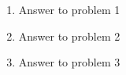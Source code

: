 

\oddsidemargin 0in
\evensidemargin 0in
\textwidth 6.5in
\topmargin -0.5in
\textheight 9.0in




\pagestyle{myheadings}

\begin{enumerate}
\item Answer to problem 1
\item Answer to problem 2
\item Answer to problem 3
\end{enumerate}



